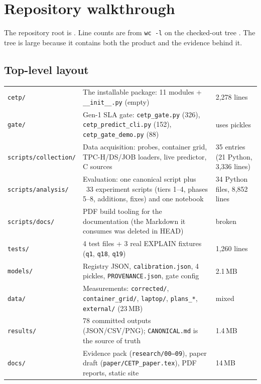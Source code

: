 \chapter{Repository walkthrough}\label{ch:repo}

The repository root is . Line counts are from \texttt{wc -l} on the checked-out tree
\evRUN. The tree is large because it contains both the product and the evidence behind it.

\section{Top-level layout}
\begin{center}\small
\begin{longtable}{@{}L{3.1cm}L{9.4cm}L{2.2cm}@{}}
\toprule {} &  & \\ \midrule \endhead
\texttt{cetp/} & The installable package: 11 modules + \texttt{\_\_init\_\_.py} (empty) & 2,278 lines\\
\texttt{gate/} & Gen-1 SLA gate: \texttt{cetp\_gate.py} (326), \texttt{cetp\_predict\_cli.py} (152), \texttt{cetp\_gate\_demo.py} (88) & uses pickles\\
\texttt{scripts/collection/} & Data acquisition: probes, container grid, TPC-H/DS/JOB loaders, live predictor, C sources & 35 entries (21 Python, 3,336 lines)\\
\texttt{scripts/analysis/} & Evaluation: one canonical script plus ~33 experiment scripts (tiers 1--4, phases 5--8, additions, fixes) and one notebook & 34 Python files, 8,852 lines\\
\texttt{scripts/docs/} & PDF build tooling for the documentation (the Markdown it consumes was deleted in HEAD) & broken\\
\texttt{tests/} & 4 test files + 3 real EXPLAIN fixtures (\texttt{q1}, \texttt{q18}, \texttt{q19}) & 1,260 lines\\
\texttt{models/} & Registry JSON, \texttt{calibration.json}, 4 pickles, \texttt{PROVENANCE.json}, gate config & 2.1\,MB\\
\texttt{data/} & Measurements: \texttt{corrected/}, \texttt{container\_grid/}, \texttt{laptop/}, \texttt{plans\_*}, \texttt{external/} (23\,MB) & mixed\\
\texttt{results/} & 78 committed outputs (JSON/CSV/PNG); \texttt{CANONICAL.md} is the source of truth & 1.4\,MB\\
\texttt{docs/} & Evidence pack (\texttt{research/00--09}), paper draft (\texttt{paper/CETP\_paper.tex}), PDF reports, static site & 14\,MB\\

\end{longtable}
\end{center}
